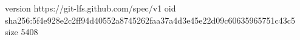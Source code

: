 version https://git-lfs.github.com/spec/v1
oid sha256:5f4e928e2c2ff94d40552a8745262faa37a4d3e45e22d09c60635965751c43c5
size 5408
